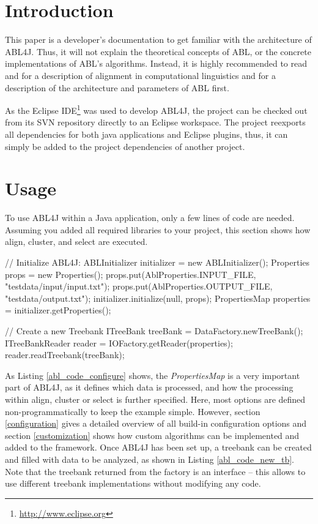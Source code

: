 \documentclass[12pt,a4paper]{article}
\newcommand{\link}[1]{\href{#1}{#1}}
\begin{document}
\section{Introduction}
This paper is a developer's documentation to get familiar with the architecture
of ABL4J. Thus, it will not explain the theoretical concepts of ABL, or the
concrete implementations of ABL's algorithms. Instead, it is highly recommended to
read \cite{vanZaanen:2001p141} and \cite{vanZaanen:2003p72} for a description
of alignment in computational linguistics and \cite{Geertzen:2006p11} for a
description of the architecture and parameters of ABL first.

As the Eclipse IDE\footnote{\link{http://www.eclipse.org}} was used to develop
ABL4J, the project can be checked out from its SVN repository directly to an
Eclipse workspace. The project reexports all dependencies for both java
applications and Eclipse plugins, thus, it can simply be added to the project
dependencies of another project.

\section{Usage}
\label{usage}
To use ABL4J within a Java application, only a few lines of code are needed.
Assuming you added all required libraries to your project, this section shows
how align, cluster, and select are executed.

\begin{java} [caption={Programmatically configuring ABL4J},label={abl_code_configure}] 
		// Initialize ABL4J: ABLInitializer initializer = new ABLInitializer();
		Properties props = new Properties();
		props.put(AblProperties.INPUT_FILE, "testdata/input/input.txt");
		props.put(AblProperties.OUTPUT_FILE, "testdata/output.txt");
		initializer.initialize(null, props);
		PropertiesMap properties = initializer.getProperties();
		
		// Create a new Treebank
		ITreeBank treeBank = DataFactory.newTreeBank();
		ITreeBankReader reader = IOFactory.getReader(properties);
		reader.readTreebank(treeBank);
\end{java}

As Listing \ref{abl_code_configure} shows, the \emph{PropertiesMap} is a very
important part of ABL4J, as it defines which data is processed, and how the
processing within align, cluster or select is further specified. Here,
most options are defined non-programmatically to keep the example simple.
However, section \ref{configuration} gives a detailed overview of all
build-in configuration options and section \ref{customization} shows how custom
algorithms can be implemented and added to the framework. Once ABL4J has been
set up, a treebank can be created and filled with data to be analyzed, as shown
in Listing \ref{abl_code_new_tb}. Note that the treebank returned from the
factory is an interface -- this allows to use different treebank
implementations without modifying any code.
\end{document}
